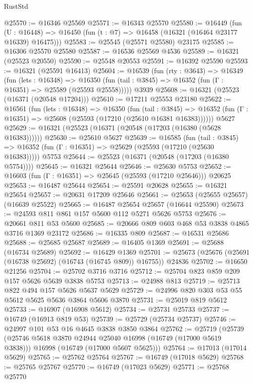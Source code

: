 \begin{lexlean}{RustStd}
\begin{coremodule}
@25570 := @16346 @25569
@25571 := @16343 @25570
@25580 := @16449
    (fun (U : @16448) => @16450 (fun (t : @7) => @16458 (@16321 (@16464 @23177 @16339) @16475)))
@25583 := @25545 (@25571 @25580) @23175
@25585 := @16306 @25570 @25580
@25587 := @16536 @25569 @4536
@25589 := @16321 (@25523 @20550)
@25590 := @25548 @20553
@25591 := @16392 @25590
@25593 := @16321 (@25591 @16413)
@25604 := @16539
    (fun (rty : @3643) =>
    @16349
      (fun (lets : @16348) =>
      @16350 (fun (tail : @3845) => @16352 (fun (Γ : @16351) => @25589 (@25593 @25558)))))
    @3939
@25608 := @16321 (@25523 (@16371 (@20548 @17204)))
@25610 := @17211 @25553 @23180
@25622 := @16561
    (fun (lets : @16348) =>
    @16350
      (fun (tail : @3845) =>
      @16352 (fun (Γ : @16351) => @25608 (@25593 (@17210 (@25610 @16381 @16383))))))
    @5627
@25629 := @16321 (@25523 (@16371 (@20548 (@17203 (@16380 (@5628 @16383))))))
@25630 := @25610 @5627
@25639 := @16585
    (fun (tail : @3845) => @16352 (fun (Γ : @16351) => @25629 (@25593 (@17210 (@25630 @16383)))))
    @5753
@25644 := @25523 (@16371 (@20548 (@17203 (@16380 @5754))))
@25645 := @16321 @25644
@25646 := @25630 @5753
@25652 := @16603 (fun (Γ : @16351) => @25645 (@25593 (@17210 @25646))) @20625
@25653 := @16487 @25644
@25654 := @25591 @20628
@25655 := @16321 @25654
@25657 := @20631 @17209 @25646
@25661 := @25653 (@25655 @25657) (@16639 @25522)
@25665 := @16487 @25654 @25657 (@16644 @25590)
@25673 := @24593 @811 @861 @157 @5600 @112 @5271 @5626 @5753
@25676 := @20661 @811 @53 @5600
@25685 := @20666 @809 @603 @468 @53 @3838 @4865 @3716 @1369 @23172
@25686 := @16335 @809
@25687 := @16531 @25686
@25688 := @25685 @25687
@25689 := @16405 @1369
@25691 := @25688 (@16734 @25689)
@25692 := @16429 @1369
@25701 := @25673 (@25676 (@25691 (@16738 @25692) (@16743 (@16745 @809)) @16755)) @24836
@25702 := @16650 @21256
@25704 := @25702 @3716 @3716
@25712 := @25704 @823 @859 @209 @157 @5626 @5639 @3838 @5753
@25713 := @24988 @813
@25719 := @25713 @822 @494 @157 @5626 @5637 @5629
@25729 := @24996 @820 @303 @53 @55 @5612 @5625 @5636 @3864 @5606 @3870
@25731 := @25019 @819 @5612
@25733 := @16907 (@16908 @5612)
@25734 := @25731 @25733
@25737 := @16749 (@16913 @819 @53)
@25739 := @25729 (@25734 @25737)
@25746 := @24997 @101 @53 @16 @4645 @3838 @3850 @3864
@25762 := @25719
    (@25739
      (@25746 @5618 @3870 @24944 @25040 @16998 (@16749 (@17000 @5619 @3838)))
      @16998
      (@16749 (@17000 @5607 @5625)))
@25764 := @17013 (@17014 @5629)
@25765 := @25762 @25764
@25767 := @16749 (@17018 @5629)
@25768 := @25765 @25767
@25770 := @16749 (@17023 @5629)
@25771 := @25768 @25770

\end{coremodule}
\end{lexlean}

